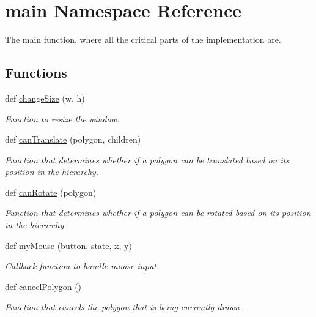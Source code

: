 \hypertarget{namespacemain}{}\section{main Namespace Reference}
\label{namespacemain}


The main function, where all the critical parts of the implementation are.  


\subsection*{Functions}
\begin{DoxyCompactItemize}
\item 
def \hyperlink{namespacemain_a526cfe84f4e80095febf0d3f4b7b5358}{change\+Size} (w, h)
\begin{DoxyCompactList}\small\item\em Function to resize the window. \end{DoxyCompactList}\item 
def \hyperlink{namespacemain_a88fcd4aa7193703d53a8095e78a40fe9}{can\+Translate} (polygon, children)
\begin{DoxyCompactList}\small\item\em Function that determines whether if a polygon can be translated based on its position in the hierarchy. \end{DoxyCompactList}\item 
def \hyperlink{namespacemain_ae1d466859928a06baa89a7b9279f4fa1}{can\+Rotate} (polygon)
\begin{DoxyCompactList}\small\item\em Function that determines whether if a polygon can be rotated based on its position in the hierarchy. \end{DoxyCompactList}\item 
def \hyperlink{namespacemain_a0f7b954a9ec1b9e21e5d888e630d1ed0}{my\+Mouse} (button, state, x, y)
\begin{DoxyCompactList}\small\item\em Callback function to handle mouse input. \end{DoxyCompactList}\item 
\mbox{\label{namespacemain_a9641b8c073c7079e597f39b5f7f6cf0d}} 
def \hyperlink{namespacemain_a9641b8c073c7079e597f39b5f7f6cf0d}{cancel\+Polygon} ()
\begin{DoxyCompactList}\small\item\em Function that cancels the polygon that is being currently drawn. \end{DoxyCompactList}\item 

\end{DoxyCompactItemize}
